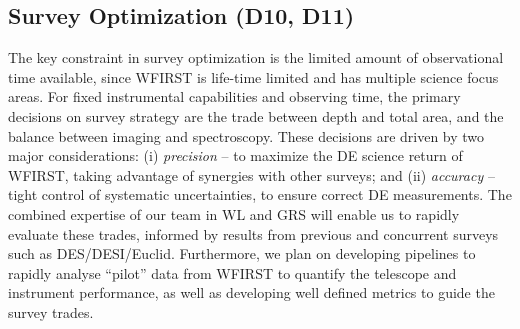 \subsection{Survey Optimization (D10, D11)}
\label{sec:sur_opt}

The key constraint in survey optimization is the limited amount of observational time
available, since WFIRST is life-time limited and has multiple science focus areas.
For fixed instrumental capabilities and observing time, the primary
decisions on survey strategy are the trade between depth and total area, and
the balance between imaging and spectroscopy. 
These decisions are driven by two major considerations: 
(i) {\em precision} -- to maximize the DE science return of WFIRST, taking advantage of synergies with other surveys; and
(ii) {\em accuracy} -- tight control of systematic uncertainties, to ensure correct DE measurements.
The combined expertise of our team in WL and GRS will enable us to rapidly evaluate
these trades, informed by results from previous and concurrent surveys such as 
DES/DESI/Euclid. Furthermore, we plan on developing pipelines to
rapidly analyse ``pilot'' data from WFIRST to quantify the telescope
and instrument performance, as well as developing well defined metrics to guide the survey trades.

